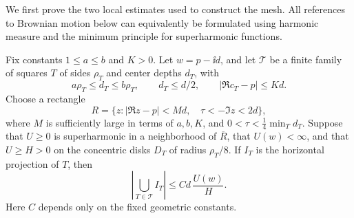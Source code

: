 We first prove the two local estimates used to construct the mesh.
All references to Brownian motion below can equivalently be formulated
using harmonic measure and the minimum principle for superharmonic
functions.

\begin{lemma}
\label{model:mesh-shadow}
Fix constants \(1\le a\le b\) and \(K>0\).  Let \(w=p-\ii d\), and let
\(\mathcal T\) be a finite family of squares \(T\) of sides \(\rho_T\)
and center depths \(d_T\), with
\[
 a\rho_T\le d_T\le b\rho_T,\qquad
 d_T\le d/2,\qquad |\Re c_T-p|\le Kd.
\]
Choose a rectangle
\[
 R=\{z:|\Re z-p|<Md,\quad \tau<-\Im z<2d\},
\]
where \(M\) is sufficiently large in terms of \(a,b,K\), and
\(0<\tau<\frac14\min_T d_T\).  Suppose that \(U\ge0\) is
superharmonic in a neighborhood of \(\overline R\), that \(U(w)<\infty\),
and that \(U\ge H>0\) on the concentric disks \(D_T\) of radius
\(\rho_T/8\).  If \(I_T\) is the horizontal projection of \(T\), then
\begin{equation}
 \left|\bigcup_{T\in\mathcal T}I_T\right|
 \le C d\,\frac{U(w)}{H}.
 \label{model:mesh-shadow-bound}
\end{equation}
Here \(C\) depends only on the fixed geometric constants.
\end{lemma}

